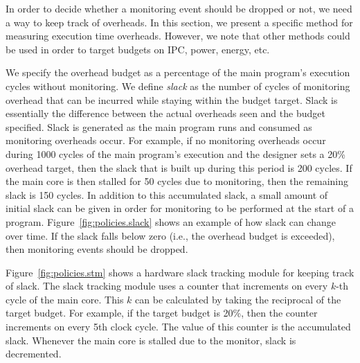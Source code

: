 In order to decide whether a monitoring event should be dropped or not, we need
a way to keep track of overheads. In this section, we present a specific method
for measuring execution time overheads. However, we note that other methods
could be used in order to target budgets on IPC, power, energy, etc.  

We specify the overhead budget as a percentage of the main program's execution
cycles without monitoring. We define \emph{slack} as the number of cycles of
monitoring overhead that can be incurred while staying within the budget
target. Slack is essentially the difference between the actual overheads seen
and the budget specified. Slack is generated as the main program runs and consumed as monitoring overheads occur.  For
example, if no monitoring overheads occur during 1000 cycles of the main
program's execution and the designer sets a 20\% overhead target, then the
slack that is built up during this period is 200 cycles. If the main core is
then stalled for 50 cycles due to monitoring, then the remaining slack is 150
cycles. 
In addition to this accumulated slack, a small amount of initial slack
can be given in order for monitoring to be performed at the start of a program.
Figure~\ref{fig:policies.slack} shows an example of how slack can change over time.
If the slack falls below zero (i.e., the overhead budget is exceeded), then
monitoring events should be dropped.

Figure~\ref{fig:policies.stm} shows a hardware slack tracking module for
keeping track of slack. The slack tracking module uses a counter that increments on every $k$-th
cycle of the main core. This $k$ can be calculated by taking the reciprocal of
the target budget. For example, if the target budget is 20\%, then the counter
increments on every 5th clock cycle. The value of this counter is the
accumulated slack. Whenever the main core is stalled due to the monitor, slack
is decremented.

